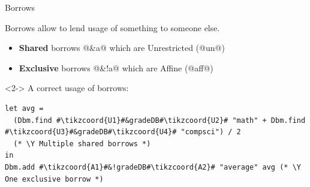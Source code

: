 \documentclass[aspectratio=169,dvipsnames,svgnames,10pt]{beamer}
\newcommand\Y{{\color{Green}{\ding{52}}}}
\begin{document}
\begin{frame}[t,fragile]{Borrows}
  
  Borrows allow to lend usage of something to someone else.
  \begin{itemize}
  \item \textbf{Shared} borrows @&a@ which are Unrestricted (@un@)
  \item \textbf{Exclusive} borrows @&!a@ which are Affine (@aff@)
  \end{itemize}

  \begin{onlyenv}<2->
  A correct usage of borrows:
\begin{verbatim}
let avg =
  (Dbm.find #\tikzcoord{U1}#&gradeDB#\tikzcoord{U2}# "math" + Dbm.find #\tikzcoord{U3}#&gradeDB#\tikzcoord{U4}# "compsci") / 2
  (* \Y Multiple shared borrows *)
in
Dbm.add #\tikzcoord{A1}#&!gradeDB#\tikzcoord{A2}# "average" avg (* \Y One exclusive borrow *)
\end{verbatim}
  \end{onlyenv}
  
\end{frame}
\end{document}
